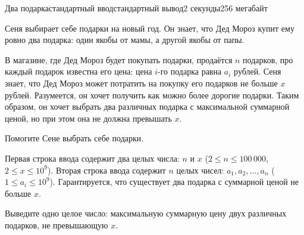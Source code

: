 \begin{problem}{Два подарка}{стандартный ввод}{стандартный вывод}{2 секунды}{256 мегабайт}

Сеня выбирает себе подарки на новый год. Он знает, что Дед Мороз купит ему ровно два подарка: один
якобы от мамы, а другой якобы от папы.

В магазине, где Дед Мороз будет покупать подарки,
продаётся $n$ подарков, про каждый подарок известна его цена: цена $i$-го подарка равна $a_i$ рублей. 
Сеня знает, что Дед Мороз может потратить на покупку его подарков не больше $x$ рублей.
Разумеется, он хочет получить как можно более дорогие подарки. Таким образом, он хочет выбрать два
различных подарка с максимальной суммарной ценой, но при этом она не должна превышать $x$.

Помогите Сене выбрать себе подарки.

\InputFile
Первая строка ввода содержит два целых числа: $n$ и $x$ ($2 \le n \le 100\,000$, $2 \le x \le 10^9$).
Вторая строка ввода содержит $n$ целых чисел: $a_1, a_2, \ldots, a_n$ ($1 \le a_i \le 10^9$).
Гарантируется, что существует два подарка с суммарной ценой не больше $x$.

\OutputFile
Выведите одно целое число: максимальную суммарную цену двух различных подарков, не превышающую $x$.

\Example

\begin{example}%
%
\end{example}

\end{problem}
